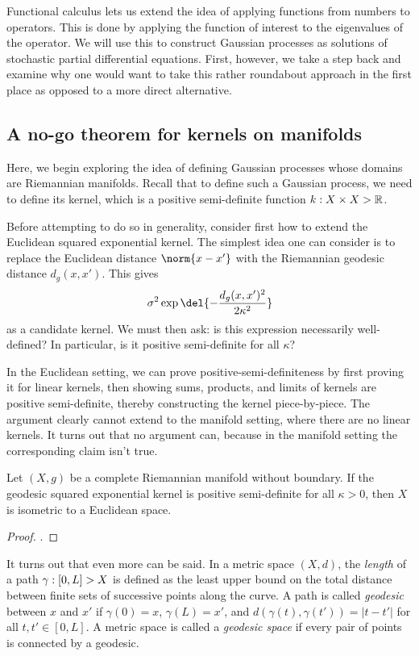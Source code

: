\documentclass[11pt]{book}
\begin{document}
Functional calculus lets us extend the idea of applying functions from numbers to operators.
This is done by applying the function of interest to the eigenvalues of the operator.
We will use this to construct Gaussian processes as solutions of stochastic partial differential equations.
First, however, we take a step back and examine why one would want to take this rather roundabout approach in the first place as opposed to a more direct alternative.

\subsection{A no-go theorem for kernels on manifolds}

Here, we begin exploring the idea of defining Gaussian processes whose domains are Riemannian manifolds.
Recall that to define such a Gaussian process, we need to define its kernel, which is a positive semi-definite function $k : X \times X \-> \mathbb{R}$.

Before attempting to do so in generality, consider first how to extend the Euclidean squared exponential kernel.
The simplest idea one can consider is to replace the Euclidean distance $\norm{x-x'}$ with the Riemannian geodesic distance $d_g(x,x')$.
This gives 
\[
\sigma^2 \exp\del{-\frac{d_g(x,x')^2}{2\kappa^2}}
\]
as a candidate kernel.
We must then ask: is this expression necessarily well-defined? 
In particular, is it positive semi-definite for all $\kappa$?

In the Euclidean setting, we can prove positive-semi-definiteness by first proving it for linear kernels, then showing sums, products, and limits of kernels are positive semi-definite, thereby constructing the kernel piece-by-piece.
The argument clearly cannot extend to the manifold setting, where there are no linear kernels.
It turns out that no argument can, because in the manifold setting the corresponding claim isn't true.

\begin{result}
Let $(X,g)$ be a complete Riemannian manifold without boundary.
If the geodesic squared exponential kernel is positive semi-definite for all $\kappa > 0$, then $X$ is isometric to a Euclidean space.
\end{result}

\begin{proof}
\textcite[Theorem 2]{feragen15}.
\end{proof}

It turns out that even more can be said.
In a metric space $(X,d)$, the \emph{length} of a path  $\gamma : [0,L] \-> X$ is defined as the least upper bound on the total distance between finite sets of successive points along the curve.
A path is called \emph{geodesic} between $x$ and $x'$ if $\gamma(0) = x$, $\gamma(L) = x'$, and $d(\gamma(t),\gamma(t')) = |t - t'|$ for all $t,t'\in[0,L]$.
A metric space is called a \emph{geodesic space} if every pair of points is connected by a geodesic.
\end{document}
